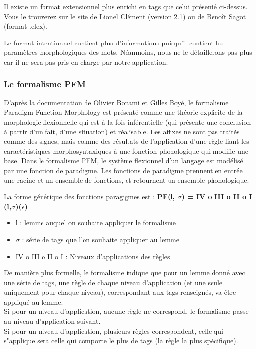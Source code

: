 \documentclass[12pt,a4paper]{article}
\begin{document}
    Il existe un format extensionnel plus enrichi en tags que celui présenté ci-dessus. Vous le trouverez sur le site de Lionel Clément (version 2.1) ou de Benoît Sagot (format .elex).

    Le format intentionnel contient plus d'informations puisqu'il contient les paramètres morphologiques des mots.
    Néanmoins, nous ne le détaillerons pas plus car il ne sera pas pris en charge par notre application.

    \subsubsection{Le formalisme PFM}

    D'après la documentation \cite{Formalisme} de Olivier Bonami et Gilles Boyé, le formalisme Paradigm Function Morphology est présenté comme une théorie explicite de la morphologie flexionnelle qui est à la fois inférentielle (qui présente une conclusion à partir d'un fait, d'une situation) et réalisable. Les affixes ne sont pas traités comme des signes, mais comme des résultats de l'application d'une règle liant les caractéristiques morphosyntaxiques à une fonction phonologique qui modifie une base.
    Dans le formalisme PFM, le système flexionnel d'un langage est modélisé par une fonction de paradigme.
    Les fonctions de paradigme prennent en entrée une racine et un ensemble de fonctions, et retournent un ensemble phonologique.

    La forme générique des fonctions paragigmes est : \textbf{PF(l, $\sigma$) = IV o III o II o I (l,$\sigma$)($\epsilon$)}
    \begin{itemize}
        \item l : lemme auquel on souhaite appliquer le formalisme
        \item $\sigma$ : série de tags que l'on souhaite appliquer au lemme
        \item IV o III o II o I : Niveaux d'applications des règles
    \end{itemize}

    \smallbreak

    De manière plus formelle, le formalisme indique que pour un lemme donné avec une série de tags, une règle de chaque niveau d'application (et une seule uniquement pour chaque niveau), correspondant aux tags renseignés, va être appliqué au lemme. \\
    Si pour un niveau d'application, aucune règle ne correspond, le formalisme passe au niveau d'application suivant. \\
    Si pour un niveau d'application, plusieurs règles correspondent, celle qui s"applique sera celle qui comporte le plus de tags (la règle la plus spécifique).
\end{document}
